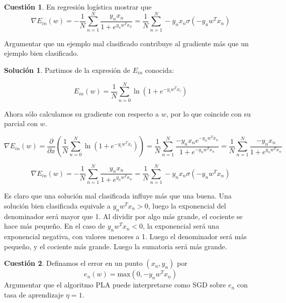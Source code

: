 \documentclass[a4paper, 11pt]{article}
\theoremstyle{definition}
\newtheorem{cuestion}{Cuestión}
\newtheorem*{solucion}{Solución}
\begin{document}
  \begin{cuestion}
    En regresión logística mostrar que
    \[
    \nabla E_{in}(w)=-\frac{1}{N}\sum_{n=1}^{N}\frac{y_nx_n}{1+e^{y_nw^Tx_n}}= \frac{1}{N}\sum_{n=1}^{N}-y_nx_n\sigma(-y_nw^Tx_n)
    \]

    Argumentar que un ejemplo mal clasificado contribuye  al gradiente más que un ejemplo bien clasificado.
  \end{cuestion}

  \begin{solucion}
    Partimos de la expresión de $E_{in}$ conocida:

    $$E_{in}(w) = \frac{1}{N} \sum_{n=0}^{N}\ln \left(1 + e^{-y_iw^Tx_i} \right) $$

    Ahora sólo calculamos su gradiente con respecto a $w$, por lo que coincide con su parcial con $w$.

    $$\nabla E_{in}(w)=\frac{\partial}{\partial x} \left( \frac{1}{N} \sum_{n=0}^{N}\ln \left(1 + e^{-y_iw^Tx_i} \right) \right) = \frac{1}{N}\sum_{n=1}^{N}\frac{-y_nx_ne^{-y_nw^Tx_n}}{1+e^{-y_nw^Tx_n}} = \frac{1}{N}\sum_{n=1}^{N}\frac{-y_nx_n}{1+e^{y_nw^Tx_n}} $$

    $$\nabla E_{in}(w)=-\frac{1}{N}\sum_{n=1}^{N}\frac{y_nx_n}{1+e^{y_nw^Tx_n}} = \frac{1}{N}\sum_{n=1}^{N}-y_nx_n\sigma(-y_nw^Tx_n)$$

    Es claro que una solución mal clasificada influye más que una buena. Una solución bien clasificada equivale a $y_nw^Tx_n > 0$, luego la exponencial del denominador será mayor que 1. Al dividir por algo más grande, el cociente se hace más pequeño. En el caso de $y_nw^Tx_n < 0$, la exponencial será una exponencial negativa, con valores menores a 1. Luego el denominador será más pequeño, y el cociente más grande. Luego la sumatoria será más grande.
  \end{solucion}

  \begin{cuestion}
    Definamos el error en un punto $(x_n,y_n)$ por
      \[
      e_n(w)=\text{max}(0,-y_nw^Tx_n)
      \]
      Argumentar que el algoritmo PLA puede interpretarse como SGD sobre $e_n$ con tasa de aprendizaje $\eta=1$.
  \end{cuestion}
\end{document}
